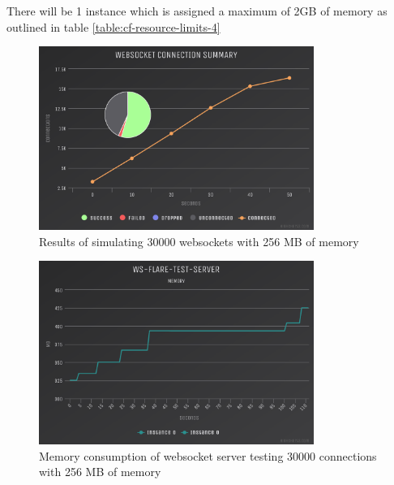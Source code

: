 There will be 1 instance which is assigned a maximum of 2GB of memory as outlined in table \ref{table:cf-resource-limits-4}

\begin{table}[H]
\caption{Cloud Foundry Resource Limits}
\label{table:cf-resource-limits-4}
\end{table}

\begin{figure}[H]
  \centering
    \includegraphics[width=0.8\textwidth]{figures/experiments/experiment-1/node-js/conn-summary-30000-256-memory.png}
    \caption{Results of simulating 30000 websockets with 256 MB of memory}
    \label{fig:experiment-3-conn-summary-5000-1-instances-256-mem}
\end{figure}

\begin{figure}[H]
  \centering
    \includegraphics[width=0.8\textwidth]{figures/experiments/experiment-1/node-js/memory-30000-256-memory.png}
    \caption{Memory consumption of websocket server testing 30000 connections with 256 MB of memory}
    \label{fig:experiment-3-memory-5000-1-instances-256-mem}
\end{figure}

